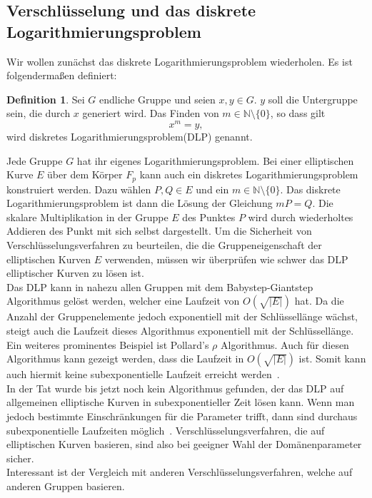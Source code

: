 \documentclass[hidelinks]{article}
\theoremstyle{plain}
\theoremstyle{definition}
\newtheorem{defn}[thm]{Definition}
\theoremstyle{rem}
\begin{document}
\begin{sloppypar}
\subsection{Verschlüsselung und das diskrete Logarithmierungsproblem}
Wir wollen zunächst das diskrete Logarithmierungsproblem wiederholen. Es ist folgendermaßen definiert:
\begin{defn} \label{DLP}
    Sei $G$ endliche Gruppe und seien $x,y \in G$. $y$ soll die Untergruppe sein, die durch $x$ generiert wird. Das Finden von $m \in \mathbb{N} \setminus \{0\}$, so dass gilt
    \begin{equation*}
        x^m = y,
    \end{equation*}
    wird diskretes Logarithmierungsproblem(DLP) genannt.
\end{defn}
Jede Gruppe $G$ hat ihr eigenes Logarithmierungsproblem.
Bei einer elliptischen Kurve $E$ über dem Körper $F_p$ kann auch ein diskretes Logarithmierungsproblem konstruiert werden. Dazu wählen $P,Q \in E$ und ein $m \in \mathbb{N} \setminus \{0\}$. Das diskrete Logarithmierungsproblem ist dann die Lösung der Gleichung $mP = Q$. 
Die skalare Multiplikation in der Gruppe $E$ des Punktes $P$ wird durch wiederholtes Addieren des Punkt mit sich selbst dargestellt. 
Um die Sicherheit von Verschlüsselungsverfahren zu beurteilen, die die Gruppeneigenschaft der elliptischen Kurven $E$ verwenden, müssen wir überprüfen wie schwer das DLP elliptischer Kurven zu lösen ist. \\
\newline
Das DLP kann in nahezu allen Gruppen mit dem Babystep-Giantstep Algorithmus gelöst werden, welcher eine Laufzeit von $O(\sqrt{|E|})$ hat.
Da die Anzahl der Gruppenelemente jedoch exponentiell mit der Schlüssellänge wächst, steigt auch die Laufzeit dieses Algorithmus exponentiell mit der Schlüssellänge.
Ein weiteres prominentes Beispiel ist Pollard's $\rho$ Algorithmus. Auch für diesen Algorithmus kann gezeigt werden, dass die Laufzeit in $O(\sqrt{|E|})$ ist. Somit kann auch hiermit keine subexponentielle Laufzeit erreicht werden~\cite[Seite~386]{silverman}. \\
In der Tat wurde bis jetzt noch kein Algorithmus gefunden, der das DLP auf allgemeinen elliptische Kurven in subexponentieller Zeit lösen kann. Wenn man jedoch bestimmte Einschränkungen für die Parameter trifft, dann sind durchaus subexponentielle Laufzeiten möglich~\cite{joux2011}.
Verschlüsselungsverfahren, die auf elliptischen Kurven basieren, sind also bei geeigner Wahl der Domänenparameter sicher. \\
\newline
Interessant ist der Vergleich mit anderen Verschlüsselungsverfahren, welche auf anderen Gruppen basieren.

\end{sloppypar}
\end{document}
